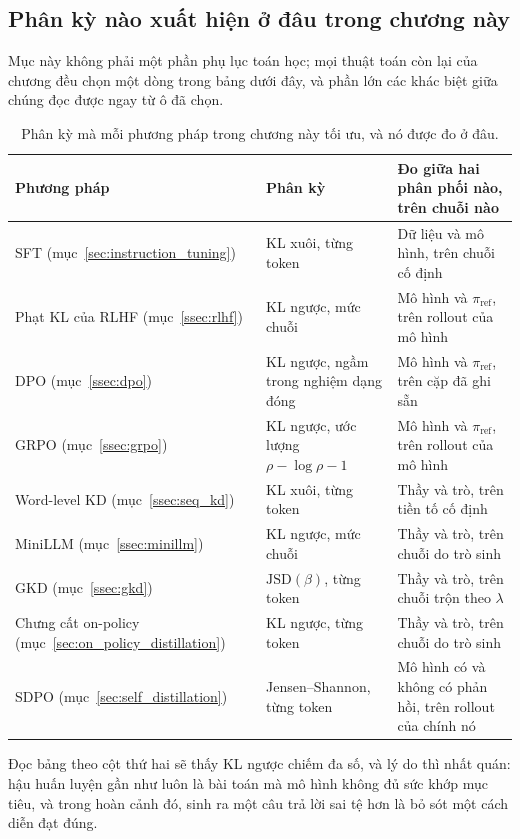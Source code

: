\subsection{Phân kỳ nào xuất hiện ở đâu trong chương này}
\label{ssec:divergence_map}

Mục này không phải một phần phụ lục toán học; mọi thuật toán còn lại của chương đều chọn một dòng trong bảng dưới đây, và phần lớn các khác biệt giữa chúng đọc được ngay từ ô đã chọn.

\begin{table}[H]
\centering\small
\caption{Phân kỳ mà mỗi phương pháp trong chương này tối ưu, và nó được đo ở đâu.}
\label{tab:divergence_usage}
\begin{tabularx}{\textwidth}{@{}>{\raggedright\arraybackslash}p{3.5cm}>{\raggedright\arraybackslash}p{4.0cm}X@{}}
\toprule
\textbf{Phương pháp} & \textbf{Phân kỳ} & \textbf{Đo giữa hai phân phối nào, trên chuỗi nào} \\
\midrule
SFT (mục~\ref{sec:instruction_tuning}) & KL xuôi, từng token & Dữ liệu và mô hình, trên chuỗi cố định \\
\addlinespace
Phạt KL của RLHF (mục~\ref{ssec:rlhf}) & KL ngược, mức chuỗi & Mô hình và $\pi_{\text{ref}}$, trên rollout của mô hình \\
\addlinespace
DPO (mục~\ref{ssec:dpo}) & KL ngược, ngầm trong nghiệm dạng đóng & Mô hình và $\pi_{\text{ref}}$, trên cặp đã ghi sẵn \\
\addlinespace
GRPO (mục~\ref{ssec:grpo}) & KL ngược, ước lượng $\rho - \log\rho - 1$ & Mô hình và $\pi_{\text{ref}}$, trên rollout của mô hình \\
\addlinespace
Word-level KD (mục~\ref{ssec:seq_kd}) & KL xuôi, từng token & Thầy và trò, trên tiền tố cố định \\
\addlinespace
MiniLLM (mục~\ref{ssec:minillm}) & KL ngược, mức chuỗi & Thầy và trò, trên chuỗi do trò sinh \\
\addlinespace
GKD (mục~\ref{ssec:gkd}) & $\mathrm{JSD}(\beta)$, từng token & Thầy và trò, trên chuỗi trộn theo $\lambda$ \\
\addlinespace
Chưng cất on-policy (mục~\ref{sec:on_policy_distillation}) & KL ngược, từng token & Thầy và trò, trên chuỗi do trò sinh \\
\addlinespace
SDPO (mục~\ref{sec:self_distillation}) & Jensen--Shannon, từng token & Mô hình có và không có phản hồi, trên rollout của chính nó \\
\bottomrule
\end{tabularx}
\end{table}

Đọc bảng theo cột thứ hai sẽ thấy KL ngược chiếm đa số, và lý do thì nhất quán: hậu huấn luyện gần như luôn là bài toán mà mô hình không đủ sức khớp mục tiêu, và trong hoàn cảnh đó, sinh ra một câu trả lời sai tệ hơn là bỏ sót một cách diễn đạt đúng.
